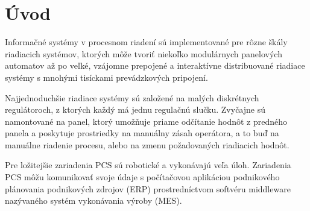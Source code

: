 \documentclass[]{tukediphc}
\begin{document}
\renewcommand\theHfigure{\theHsection.\arabic{figure}}
\renewcommand\theHtable{\theHsection.\arabic{table}}


\prvastrana


\thispagestyle{empty}
\tableofcontents
\newpage
%
%


\setcounter{page}{1}
\setcounter{equation}{0}
\setcounter{figure}{0}
\setcounter{table}{0}

\section{Úvod}


Informačné systémy v procesnom riadení sú implementované pre rôzne škály riadiacich systémov, ktorých môže tvoriť niekoľko modulárnych panelových automatov až po veľké, vzájomne prepojené a interaktívne distribuované riadiace systémy s mnohými tisíckami prevádzkových pripojení.

Najjednoduchšie riadiace systémy sú založené na malých diskrétnych regulátoroch, z ktorých každý má jednu regulačnú slučku. Zvyčajne sú namontované na panel, ktorý umožňuje priame odčítanie hodnôt z predného panela a poskytuje prostriedky na manuálny zásah operátora, a to buď na manuálne riadenie procesu, alebo na zmenu požadovaných riadiacich hodnôt.


Pre ložitejšie zariadenia PCS sú robotické a vykonávajú veľa úloh. Zariadenia PCS môžu komunikovať svoje údaje s počítačovou aplikáciou podnikového plánovania podnikových zdrojov (ERP) prostredníctvom softvéru middleware nazývaného systém vykonávania výroby (MES).
\end{document}
